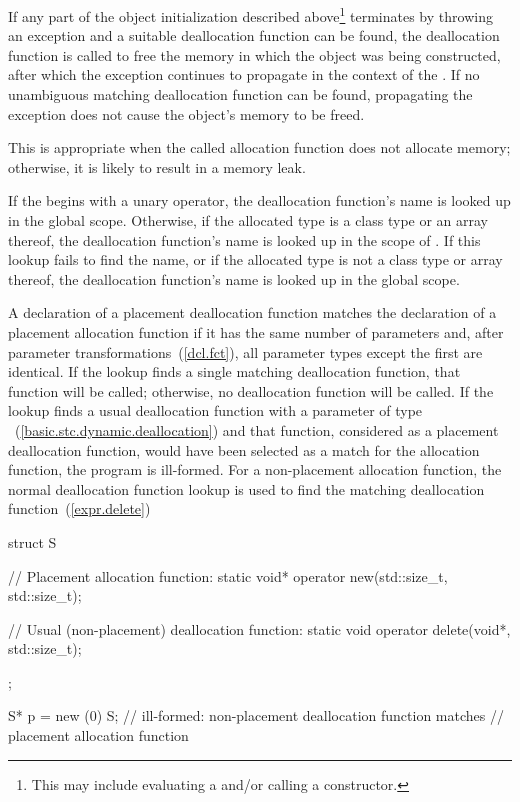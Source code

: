 \pnum
{}%
If any part of the object initialization described above\footnote{This may
include evaluating a  and/or calling
a constructor.}
terminates by throwing an exception and a suitable deallocation function
can be found, the deallocation function is called to free the memory in
which the object was being constructed, after which the exception
continues to propagate in the context of the .
If no unambiguous matching deallocation function can be found,
propagating the exception does not cause the object's memory to be
freed.
\begin{note}
This is appropriate when the called allocation function does not
allocate memory; otherwise, it is likely to result in a memory leak.
\end{note}

\pnum
If the  begins with a unary \tcode{::}
operator, the deallocation function's name is looked up in the global
scope. Otherwise, if the allocated type is a class type  or an
array thereof, the deallocation function's name is looked up in the
scope of . If this lookup fails to find the name, or if the
allocated type is not a class type or array thereof, the deallocation
function's name is looked up in the global scope.

\pnum
A declaration of a placement deallocation function matches the
declaration of a placement allocation function if it has the same number
of parameters and, after parameter transformations~(\ref{dcl.fct}), all
parameter types except the first are identical. If
the lookup finds a single matching deallocation function, that function
will be called; otherwise, no deallocation function will be called. If
the lookup finds a usual deallocation
function
with a parameter of type ~(\ref{basic.stc.dynamic.deallocation})
and that function,
considered as a placement deallocation function, would have been
selected as a match for the allocation function, the program is
ill-formed. For a non-placement allocation function, the normal deallocation
function lookup is used to find the matching deallocation
function~(\ref{expr.delete})
\begin{example}

\begin{codeblock}
struct S { 
  // Placement allocation function:
  static void* operator new(std::size_t, std::size_t); 

  // Usual (non-placement) deallocation function:
  static void operator delete(void*, std::size_t); 
}; 

S* p = new (0) S;   // ill-formed: non-placement deallocation function matches 
                    // placement allocation function 
\end{codeblock}

\end{example}

